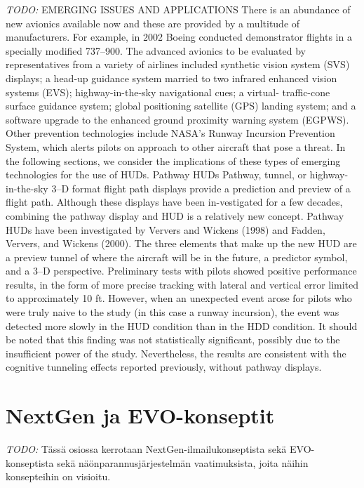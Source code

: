 \documentclass[utf8,bachelor,manualbib]{gradu3}
\begin{document}
\emph{TODO:}
EMERGING ISSUES AND APPLICATIONS
There is an abundance of new avionics available now and these are provided by
a multitude of manufacturers. For example, in 2002 Boeing conducted demonstrator
flights in a specially modified 737–900. The advanced avionics to be
evaluated by representatives from a variety of airlines included synthetic vision
system (SVS) displays; a head-up guidance system married to two infrared enhanced
vision systems (EVS); highway-in-the-sky navigational cues; a virtual-
traffic-cone surface guidance system; global positioning satellite (GPS)
landing system; and a software upgrade to the enhanced ground proximity warning
system (EGPWS). Other prevention technologies include NASA’s Runway
Incursion Prevention System, which alerts pilots on approach to other aircraft
that pose a threat. In the following sections, we consider the implications of
these types of emerging technologies for the use of HUDs.
Pathway HUDs
Pathway, tunnel, or highway-in-the-sky 3–D format flight path displays provide
a prediction and preview of a flight path. Although these displays have been in-vestigated for a few decades, combining the pathway display and HUD is a relatively
new concept.
Pathway HUDs have been investigated by Ververs and Wickens (1998) and
Fadden, Ververs, and Wickens (2000). The three elements that make up the new
HUD are a preview tunnel of where the aircraft will be in the future, a predictor
symbol, and a 3–D perspective. Preliminary tests with pilots showed positive performance
results, in the form of more precise tracking with lateral and vertical error
limited to approximately 10 ft. However, when an unexpected event arose for
pilots who were truly naive to the study (in this case a runway incursion), the event
was detected more slowly in the HUD condition than in the HDD condition. It
should be noted that this finding was not statistically significant, possibly due to
the insufficient power of the study. Nevertheless, the results are consistent with the
cognitive tunneling effects reported previously, without pathway displays. \citep{crawford2006}



\section{NextGen ja EVO-konseptit}

\emph{TODO:}
Tässä osiossa kerrotaan NextGen-ilmailukonseptista sekä EVO-konseptista sekä näönparannusjärjestelmän vaatimuksista, joita näihin konsepteihin on visioitu.
\end{document}
